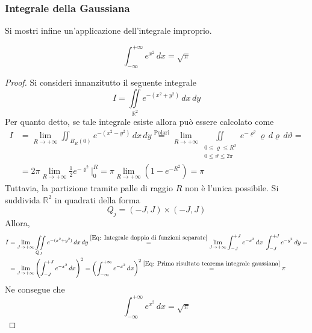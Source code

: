 \subsubsection{Integrale della Gaussiana}
Si mostri infine un'applicazione dell'integrale improprio.
\begin{theorem}
    \begin{equation}
    \int_{-\infty}^{+\infty}{e^{x^2}}\, dx = \sqrt{\pi}
    \end{equation}
\end{theorem}
\begin{proof}
    Si consideri innanzitutto il seguente integrale
    \begin{equation}
        I=\iint\limits_{\mathbb{R}^2}{e^{-(x^2+y^2)}}\,dx\,dy
    \end{equation}
    Per quanto detto, se tale integrale esiste allora può essere calcolato come
    \begin{equation} \label{Eq: Primo risultato teorema integrale gaussiana}
    \begin{aligned}
        I&=\lim_{R \to +\infty}{\iint_{B_R(0)}{e^{-(x^2-y^2)}}}\,dx\,dy \overset{\text{Polari}}{=} \lim_{R \to +\infty}{\iint\limits_{\substack{0 \leq \varrho \leq R^2\\ 0 \leq \vartheta \leq 2\pi}}{e^{-\varrho^2} \varrho}\,d\varrho\,d\vartheta}=\\
        &= 2\pi \lim_{R \to +\infty}{\frac{1}{2}}{e^{-\varrho^2}\Big|_{0}^{R}}= \pi \lim_{R \to +\infty}{(1-e^{-R^2})}= \pi
    \end{aligned}
    \end{equation}
    Tuttavia, la partizione tramite palle di raggio $R$ non è l'unica possibile. Si suddivida $\mathbb{R}^2$ in quadrati della forma
    \begin{equation}
        Q_j=(-J,J) \times (-J, J)
    \end{equation}
    Allora, 
    \begin{equation}
    \begin{aligned}
        I&= \lim_{J \to +\infty}{\iint\limits_{Q_J}{e^{-(x^2+y^2)}}\,dx\,dy}\overset{\eqref{Eq: Integrale doppio di funzioni separate}}{=} \lim_{J \to +\infty}{\int_{-J}^{+J}{e^{-x^2}}\, dx\ \int_{-J}^{+J}{e^{-y^2}}\,dy}=\\
        &=\lim_{J \to + \infty}\left(\int_{-J}^{+J}{ e^{-x^2}}\,dx\right)^2 = \left(\int_{-\infty}^{+\infty}{ e^{-x^2}}\,dx\right)^2 \overset{\eqref{Eq: Primo risultato teorema integrale gaussiana}}{=} \pi
    \end{aligned}
    \end{equation}
    Ne consegue che
    \begin{equation}
        \int_{-\infty}^{+\infty}{e^{x^2}}\, dx = \sqrt{\pi}
    \end{equation}
\end{proof}